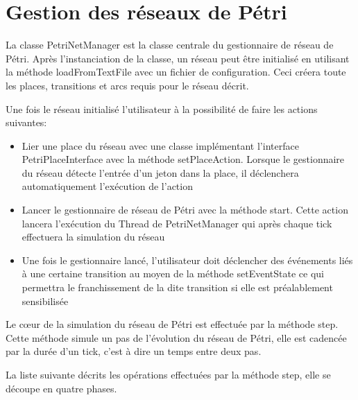 \chapter{Gestion des réseaux de Pétri}

La classe PetriNetManager est la classe centrale du gestionnaire de réseau de Pétri. Après l'instanciation de la classe, un réseau peut être initialisé en utilisant la méthode loadFromTextFile avec un fichier de configuration. Ceci créera toute les places, transitions et arcs requis pour le réseau décrit.

Une fois le réseau initialisé l'utilisateur à la possibilité de faire les actions suivantes:
\begin{itemize}
\item Lier une place du réseau avec une classe implémentant l'interface PetriPlaceInterface avec la méthode setPlaceAction. Lorsque le gestionnaire du réseau détecte l'entrée d'un jeton dans la place, il déclenchera automatiquement l'exécution de l'action
\item Lancer le gestionnaire de réseau de Pétri avec la méthode start. Cette action lancera l'exécution du Thread de PetriNetManager qui après chaque tick effectuera la simulation du réseau
\item Une fois le gestionnaire lancé, l'utilisateur doit déclencher des événements liés à une certaine transition au moyen de la méthode setEventState ce qui permettra le franchissement de la dite transition si elle est préalablement sensibilisée\\
\end{itemize}

Le cœur de la simulation du réseau de Pétri est effectuée par la méthode step. Cette méthode simule un pas de  l'évolution du réseau de Pétri, elle est cadencée par la durée d'un tick, c'est à dire un temps entre deux pas.

La liste suivante décrits les opérations effectuées par la méthode step, elle se découpe en quatre phases.

